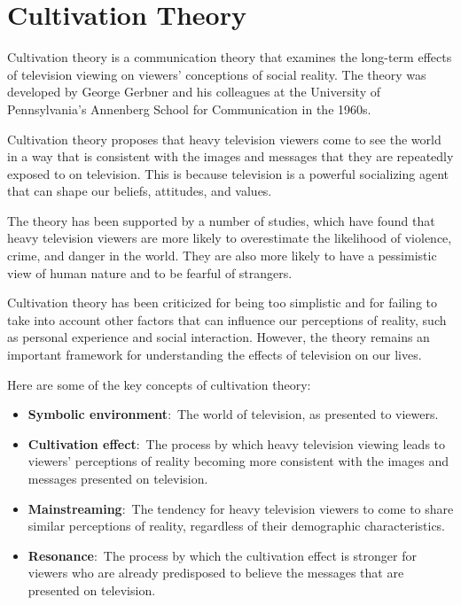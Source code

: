 \documentclass[
  b5paper]{book}
\begin{document}
\hypertarget{cultivation-theory}{%
\section{Cultivation Theory}\label{cultivation-theory}}

Cultivation theory is a communication theory that examines the long-term effects of television viewing on viewers' conceptions of social reality. The theory was developed by George Gerbner and his colleagues at the University of Pennsylvania's Annenberg School for Communication in the 1960s.

Cultivation theory proposes that heavy television viewers come to see the world in a way that is consistent with the images and messages that they are repeatedly exposed to on television. This is because television is a powerful socializing agent that can shape our beliefs, attitudes, and values.

The theory has been supported by a number of studies, which have found that heavy television viewers are more likely to overestimate the likelihood of violence, crime, and danger in the world. They are also more likely to have a pessimistic view of human nature and to be fearful of strangers.

Cultivation theory has been criticized for being too simplistic and for failing to take into account other factors that can influence our perceptions of reality, such as personal experience and social interaction. However, the theory remains an important framework for understanding the effects of television on our lives.

Here are some of the key concepts of cultivation theory:

\begin{itemize}
\item
  \textbf{Symbolic environment}:~The world of television, as presented to viewers.
\item
  \textbf{Cultivation effect}:~The process by which heavy television viewing leads to viewers' perceptions of reality becoming more consistent with the images and messages presented on television.
\item
  \textbf{Mainstreaming}:~The tendency for heavy television viewers to come to share similar perceptions of reality, regardless of their demographic characteristics.
\item
  \textbf{Resonance}:~The process by which the cultivation effect is stronger for viewers who are already predisposed to believe the messages that are presented on television.
\end{itemize}
\end{document}

